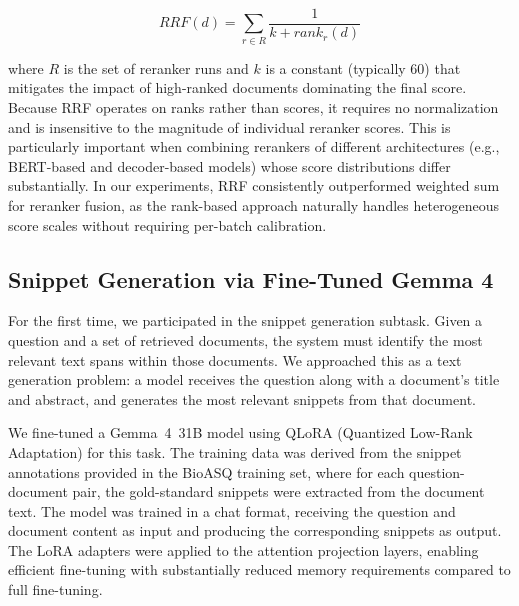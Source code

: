\begin{equation}
  RRF(d) = \sum_{r \in R} \frac{1}{k + rank_r(d)}
\end{equation}

where $R$ is the set of reranker runs and $k$ is a constant (typically 60) that mitigates the impact of high-ranked documents dominating the final score. Because RRF operates on ranks rather than scores, it requires no normalization and is insensitive to the magnitude of individual reranker scores. This is particularly important when combining rerankers of different architectures (e.g., BERT-based and decoder-based models) whose score distributions differ substantially. In our experiments, RRF consistently outperformed weighted sum for reranker fusion, as the rank-based approach naturally handles heterogeneous score scales without requiring per-batch calibration.

\subsection{Snippet Generation via Fine-Tuned Gemma 4}

For the first time, we participated in the snippet generation subtask. Given a question and a set of retrieved documents, the system must identify the most relevant text spans within those documents. We approached this as a text generation problem: a model receives the question along with a document's title and abstract, and generates the most relevant snippets from that document.

We fine-tuned a Gemma~4~31B model using QLoRA (Quantized Low-Rank Adaptation) for this task. The training data was derived from the snippet annotations provided in the BioASQ training set, where for each question-document pair, the gold-standard snippets were extracted from the document text. The model was trained in a chat format, receiving the question and document content as input and producing the corresponding snippets as output. The LoRA adapters were applied to the attention projection layers, enabling efficient fine-tuning with substantially reduced memory requirements compared to full fine-tuning.
